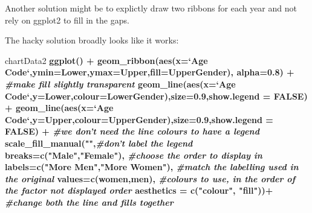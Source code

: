 \documentclass[]{article}
\newenvironment{Shaded}{\begin{snugshade}}{\end{snugshade}}
\newcommand{\KeywordTok}[1]{\textcolor[rgb]{0.13,0.29,0.53}{\textbf{#1}}}
\newcommand{\DataTypeTok}[1]{\textcolor[rgb]{0.13,0.29,0.53}{#1}}
\newcommand{\DecValTok}[1]{\textcolor[rgb]{0.00,0.00,0.81}{#1}}
\newcommand{\FloatTok}[1]{\textcolor[rgb]{0.00,0.00,0.81}{#1}}
\newcommand{\StringTok}[1]{\textcolor[rgb]{0.31,0.60,0.02}{#1}}
\newcommand{\CommentTok}[1]{\textcolor[rgb]{0.56,0.35,0.01}{\textit{#1}}}
\newcommand{\OtherTok}[1]{\textcolor[rgb]{0.56,0.35,0.01}{#1}}
\newcommand{\OperatorTok}[1]{\textcolor[rgb]{0.81,0.36,0.00}{\textbf{#1}}}
\newcommand{\NormalTok}[1]{#1}
\begin{document}
Another solution might be to explictly draw two ribbons for each year
and not rely on ggplot2 to fill in the gaps.

The hacky solution broadly looks like it works:

\begin{Shaded}
\begin{Highlighting}[]
\NormalTok{chartData2 }\OperatorTok{%>%}\StringTok{ }\KeywordTok{filter}\NormalTok{(Year}\OperatorTok{==}\DecValTok{2014}\NormalTok{) }\OperatorTok{%>%}
\StringTok{  }\KeywordTok{ggplot}\NormalTok{() }\OperatorTok{+}
\StringTok{  }\KeywordTok{geom_ribbon}\NormalTok{(}\KeywordTok{aes}\NormalTok{(}\DataTypeTok{x=}\StringTok{`}\DataTypeTok{Age Code}\StringTok{`}\NormalTok{,}\DataTypeTok{ymin=}\NormalTok{Lower,}\DataTypeTok{ymax=}\NormalTok{Upper,}\DataTypeTok{fill=}\NormalTok{UpperGender),}
              \DataTypeTok{alpha=}\FloatTok{0.8}\NormalTok{) }\OperatorTok{+}\StringTok{ }\CommentTok{#make fill slightly transparent}
\StringTok{  }\KeywordTok{geom_line}\NormalTok{(}\KeywordTok{aes}\NormalTok{(}\DataTypeTok{x=}\StringTok{`}\DataTypeTok{Age Code}\StringTok{`}\NormalTok{,}\DataTypeTok{y=}\NormalTok{Lower,}\DataTypeTok{colour=}\NormalTok{LowerGender),}\DataTypeTok{size=}\FloatTok{0.9}\NormalTok{,}\DataTypeTok{show.legend =} \OtherTok{FALSE}\NormalTok{) }\OperatorTok{+}\StringTok{ }
\StringTok{  }\KeywordTok{geom_line}\NormalTok{(}\KeywordTok{aes}\NormalTok{(}\DataTypeTok{x=}\StringTok{`}\DataTypeTok{Age Code}\StringTok{`}\NormalTok{,}\DataTypeTok{y=}\NormalTok{Upper,}\DataTypeTok{colour=}\NormalTok{UpperGender),}\DataTypeTok{size=}\FloatTok{0.9}\NormalTok{,}\DataTypeTok{show.legend =} \OtherTok{FALSE}\NormalTok{) }\OperatorTok{+}\StringTok{ }\CommentTok{#we don't need the line colours to have a legend}
\StringTok{  }\KeywordTok{scale_fill_manual}\NormalTok{(}\StringTok{""}\NormalTok{,}\CommentTok{#don't label the legend}
                    \DataTypeTok{breaks=}\KeywordTok{c}\NormalTok{(}\StringTok{"Male"}\NormalTok{,}\StringTok{"Female"}\NormalTok{), }\CommentTok{#choose the order to display in }
                    \DataTypeTok{labels=}\KeywordTok{c}\NormalTok{(}\StringTok{"More Men"}\NormalTok{,}\StringTok{"More Women"}\NormalTok{), }\CommentTok{#match the labelling used in the original}
                    \DataTypeTok{values=}\KeywordTok{c}\NormalTok{(women,men), }\CommentTok{#colours to use, in the order of the factor not displayed order}
                    \DataTypeTok{aesthetics =} \KeywordTok{c}\NormalTok{(}\StringTok{"colour"}\NormalTok{, }\StringTok{"fill"}\NormalTok{))}\OperatorTok{+}\StringTok{ }\CommentTok{#change both the line and fills together}
}
\end{Highlighting}
\end{Shaded}
\end{document}
